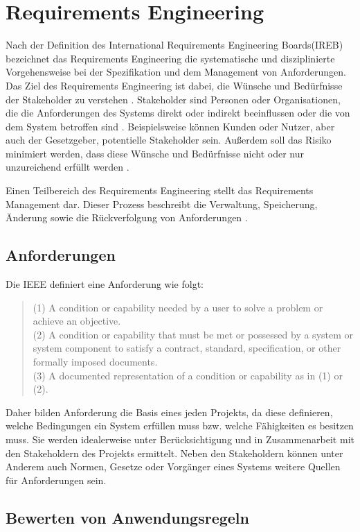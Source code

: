 \section{Requirements Engineering}
\label{chap:Requirements Engineering}
Nach der Definition des International Requirements Engineering Boards(IREB) bezeichnet das Requirements Engineering die systematische und disziplinierte Vorgehensweise bei der Spezifikation
und dem Management von Anforderungen. Das Ziel des Requirements Engineering ist dabei, die Wünsche und Bedürfnisse der Stakeholder zu verstehen \cite[S.30]{IREB_Glossary}. Stakeholder sind Personen 
oder Organisationen, die die Anforderungen des Systems direkt oder indirekt beeinflussen oder die von dem System betroffen sind \cite[S.33]{IREB_Glossary}. Beispielsweise können Kunden oder Nutzer, 
aber auch der Gesetzgeber, potentielle Stakeholder sein. Außerdem soll das Risiko minimiert werden, dass diese Wünsche und Bedürfnisse nicht oder nur unzureichend erfüllt werden \cite[S.30]{IREB_Glossary}.

Einen Teilbereich des Requirements Engineering stellt das Requirements Management dar. Dieser Prozess beschreibt die Verwaltung, Speicherung, Änderung sowie die Rückverfolgung 
von Anforderungen \cite[S.8]{IREB_Glossary}.
\subsection{Anforderungen}
Die IEEE definiert eine Anforderung wie folgt: 
\begin{quote}
    (1) A condition or capability needed by a user to solve a problem or achieve an objective.\\
    (2) A condition or capability that must be met
        or possessed by a system or system component to satisfy a contract, standard, specification, or other formally imposed documents.\\
    (3) A documented representation of a condition or capability as in (1) or (2). \cite[S.62]{IEEE_Glossary}
\end{quote}
Daher bilden Anforderung die Basis eines jeden Projekts, da diese definieren, welche Bedingungen ein System erfüllen muss bzw. welche Fähigkeiten es besitzen muss. Sie werden idealerweise 
unter Berücksichtigung und in Zusammenarbeit mit den Stakeholdern des Projekts ermittelt. Neben den Stakeholdern können unter Anderem auch Normen, Gesetze oder Vorgänger eines Systems 
weitere Quellen für Anforderungen sein.     

\subsection{Bewerten von Anwendungsregeln}
